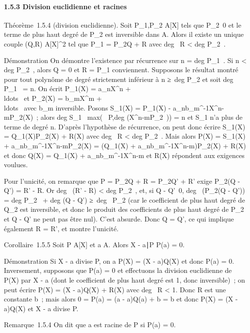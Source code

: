 \documentclass[]{article}
\begin{document}
\paragraph{1.5.3 Division euclidienne et racines}

Théorème~1.5.4 (division euclidienne). Soit P\_1,P\_2 \in
A{[}X{]} tels que P\_2\neq~0 et le terme
de plus haut degré de P\_2 est inversible dans A. Alors il
existe un unique couple (Q,R) \in A{[}X{]}^2 tel que
P\_1 = P\_2Q + R avec deg~ R
\textless{} deg P\_2~.

Démonstration On démontre l'existence par récurrence sur n
= deg P\_1~. Si n
\textless{} deg P\_2~, alors Q = 0 et R
= P\_1 conviennent. Supposons le résultat montré pour tout
polynôme de degré strictement inférieur à n ≥\
deg P\_2 et soit deg P\_1~ =
n. On écrit P\_1(X) = a\_nX^n +
\\ldots~ et
P\_2(X) = b\_mX^m +
\\ldots~ avec
b\_m inversible. Posons S\_1(X) = P\_1(X) -
a\_nb\_m^-1X^n-mP\_2(X)~;
alors deg S\_1~
\leq max(\deg~
P,deg (X^n-mP\_2~)) = n et
S\_1 n'a plus de terme de degré n. D'après l'hypothèse de
récurrence, on peut donc écrire S\_1(X) =
Q\_1(X)P\_2(X) + R(X) avec deg~
R \textless{} deg P\_2~. Mais alors
P(X) = S\_1(X) +
a\_nb\_m^-1X^n-mP\_2(X) =
(Q\_1(X) +
a\_nb\_m^-1X^n-m)P\_2(X) +
R(X) et donc Q(X) = Q\_1(X) +
a\_nb\_m^-1X^n-m et R(X) répondent aux
exigences voulues.

Pour l'unicité, on remarque que P = P\_2Q + R = P\_2Q' +
R' exige P\_2(Q - Q') = R' - R. Or deg~
(R' - R) \textless{} deg P\_2~, et, si
Q - Q'\neq~0, deg~
(P\_2(Q - Q')) = deg P\_2~
+ deg (Q - Q') ≥\ deg~
P\_2 (car le coefficient de plus haut degré de Q\_2 est
inversible, et donc le produit des coefficients de plus haut degré de
P\_2 et Q - Q' ne peut pas être nul). C'est absurde. Donc Q =
Q', ce qui implique également R = R', et montre l'unicité.

Corollaire~1.5.5 Soit P \in A{[}X{]} et a \in A. Alors X -
a∣P \mathrel\Leftrightarrow P(a) = 0.

Démonstration Si X - a divise P, on a P(X) = (X - a)Q(X) et donc P(a) =
0. Inversement, supposons que P(a) = 0 et effectuons la division
euclidienne de P(X) par X - a (dont le coefficient de plus haut degré
est 1, donc inversible)~; on peut écrire P(X) = (X - a)Q(X) + R(X) avec
deg~ R \textless{} 1. Donc R est une constante
b~; mais alors 0 = P(a) = (a - a)Q(a) + b = b et donc P(X) = (X - a)Q(X)
et X - a divise P.

Remarque~1.5.4 On dit que a est racine de P si P(a) = 0.
\end{document}
